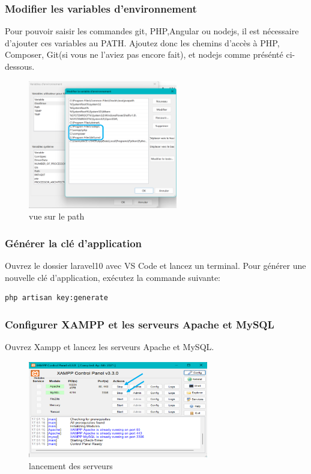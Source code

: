 \documentclass[12pt]{article}
\begin{document}
\subsubsection{Modifier les variables d’environnement}
Pour pouvoir saisir les commandes git, PHP,Angular ou nodejs, il est nécessaire d'ajouter ces variables au PATH. Ajoutez donc les chemins d'accès à PHP, Composer, Git(si vous ne l'aviez pas encore fait), et nodejs comme présénté ci-dessous.  
\smallskip
        \begin{figure}[h] 
            \centering 
            \includegraphics[width=0.58\textwidth]{./img/path.png} 
            \caption{vue sur le path}
            \label{fig:vue sur le path}
        \end{figure}   

\subsubsection{Générer la clé d'application}
Ouvrez le dossier laravel10 avec VS Code et lancez un terminal. Pour générer une nouvelle clé d'application, exécutez la commande suivante:
\medskip
        \begin{lstlisting}
php artisan key:generate
        \end{lstlisting}
\bigskip
    
\subsubsection{Configurer XAMPP et les serveurs Apache et MySQL}
Ouvrez Xampp et lancez les serveurs Apache et MySQL.
        \begin{figure}[h!] 
            \centering 
            \includegraphics[width=0.7\textwidth]{./img/xampp.png}
            \caption{lancement des serveurs}
            \label{fig:lancement des serveurs} 
        \end{figure}
\bigskip
\end{document}
